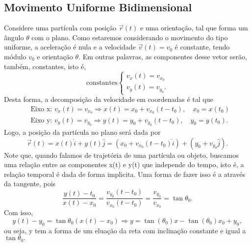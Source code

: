 \documentclass[PhysicsI/physics_notes.tex]{subfiles}
\begin{document}
\subsection{Movimento Uniforme Bidimensional}
Considere uma partícula com posição $\vec{r}(t)$ e uma orientação, tal que forma um ângulo $\theta$ com o plano. Como
estaremos considerando o movimento do tipo uniforme, a aceleração é nula e a velocidade $\vec{v}(t) = v_{0}$ é constante,
tendo módulo $v_{0}$ e orientação $\theta$. Em outras palavras, as componentes desse vetor serão, também, constantes, isto é,
$$
	\text{constantes}\left\{\begin{array}{ll}
		v_{x}(t) = v_{x_{0}} \\
		v_{y}(t) = v_{y_{0}}.
	\end{array}\right.
$$
Desta forma, a decomposição da velocidade em coordenadas é tal que
\begin{align*}
	 & \text{Eixo x: }v_{x}(t) = v_{x_{0}} \Rightarrow x(t) = x_{0} + v_{x_{0}}(t-t_{0}),\quad x_{0} = x(t_{0})  \\
	 & \text{Eixo y: }v_{y}(t) = v_{y_{0}} \Rightarrow y(t) = y_{0} + v_{y_{0}}(t-t_{0}),\quad y_{0} = y(t_{0}).
\end{align*}
Logo, a posição da partícula no plano será dada por
$$
	\vec{r}(t) = x(t)\hat{i} + y(t)\hat{j} = (x_{0} + v_{x_{0}}(t-t_{0})\hat{i}) + (y_{0} + v_{y_{0}}\hat{j}).
$$
Note que, quando falamos de trajetória de uma partícula ou objeto, buscamos uma relação entre as componentes x(t) e y(t) que
independe do tempo, isto é, a relação temporal é dada de forma implicita. Uma forma de fazer isso é a através da tangente, pois
$$
	\frac{y(t) - t_{0}}{x(t) - x_{0}} = \frac{v_{y_{0}}(t-t_{0})}{v_{x_{0}}(t-t_{0})} = \frac{v_{y_{0}}}{v_{x_{0}}} = \tan{\theta_{0}}.
$$
Com isso,
$$
	y(t) - y_{0} = \tan{\theta_{0}}(x(t)-x_{0}) \Rightarrow y = \tan{(\theta_{0})}x - \tan{(\theta_{0})}x_{0} + y_{0},
$$
ou seja, y tem a forma de um eluação da reta com inclinação constante e igual a $\tan{\theta_{0}}.$
\end{document}
